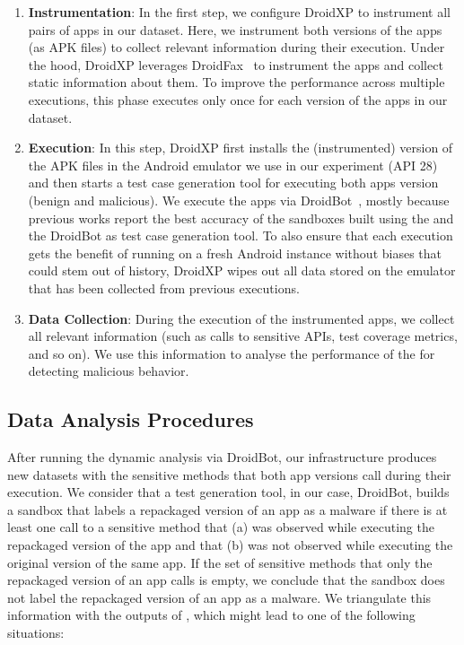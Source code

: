 \begin{enumerate}[S1]
 \item \textbf{Instrumentation}: In the first step,
we configure DroidXP to instrument all pairs of apps in our dataset.
Here, we instrument both versions of the apps (as APK files) to collect relevant information during their execution. Under the hood, DroidXP leverages
DroidFax~\cite{DBLP:conf/icsm/CaiR17a} to instrument the apps and collect static
information about them. To improve the performance across multiple executions,
this phase executes only once for each version of the apps in our dataset.

\item \textbf{Execution}: In this step, DroidXP first installs the (instrumented) version of the APK files in the Android emulator we use in our experiment (API 28) and then starts a test case generation tool for executing both apps version (benign and malicious). We execute the apps via DroidBot~\cite{DBLP:conf/icse/LiYGC17}, mostly because previous works report the best accuracy of the sandboxes built using the \mas and the DroidBot as test case generation tool. To also ensure that each execution gets the benefit of running on a fresh Android instance without biases that could stem out of history, DroidXP wipes out all data stored on the emulator that has been collected from previous executions.


\item \textbf{Data Collection}: During the execution of the instrumented apps, we collect all relevant information (such as calls to sensitive APIs, test coverage metrics, and so on). We use this information to analyse the performance of the \mas for detecting malicious behavior.
\end{enumerate}

\subsection{Data Analysis Procedures} \label{sec:dataAnalysisProc}

After running the dynamic analysis via DroidBot, our infrastructure produces
new datasets with the sensitive methods that both app versions call during their execution. We consider that a test
generation tool, in our case, DroidBot, builds a sandbox that labels a repackaged version
of an app as a malware if there is at least one call to a sensitive method that (a) was observed
while executing the repackaged version of the app and that (b) was not observed while
executing the original version of the same app. 
If the set of sensitive methods that only the repackaged version of an app calls is empty,
we conclude that the sandbox does not label the repackaged version of an app as a malware. We triangulate
this information with the outputs of \vt, which might lead to one of the following
situations:

